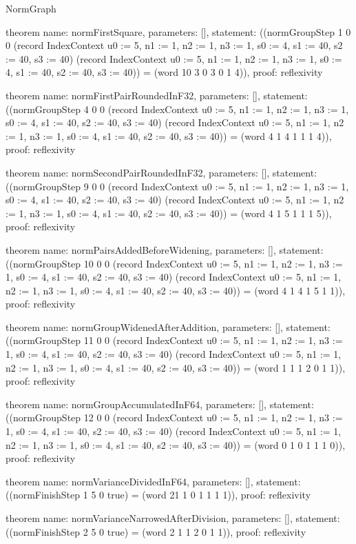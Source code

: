 \begin{lexlean}{NormGraph}
\begin{semanticmodule}
theorem{
  name: normFirstSquare,
  parameters: [],
  statement: ((normGroupStep 1 0 0 (record IndexContext {u0 := 5, n1 := 1, n2 := 1, n3 := 1, s0 := 4, s1 := 40, s2 := 40, s3 := 40}) (record IndexContext {u0 := 5, n1 := 1, n2 := 1, n3 := 1, s0 := 4, s1 := 40, s2 := 40, s3 := 40})) = (word 10 3 0 3 0 1 4)),
  proof: reflexivity{}
}

theorem{
  name: normFirstPairRoundedInF32,
  parameters: [],
  statement: ((normGroupStep 4 0 0 (record IndexContext {u0 := 5, n1 := 1, n2 := 1, n3 := 1, s0 := 4, s1 := 40, s2 := 40, s3 := 40}) (record IndexContext {u0 := 5, n1 := 1, n2 := 1, n3 := 1, s0 := 4, s1 := 40, s2 := 40, s3 := 40})) = (word 4 1 4 1 1 1 4)),
  proof: reflexivity{}
}

theorem{
  name: normSecondPairRoundedInF32,
  parameters: [],
  statement: ((normGroupStep 9 0 0 (record IndexContext {u0 := 5, n1 := 1, n2 := 1, n3 := 1, s0 := 4, s1 := 40, s2 := 40, s3 := 40}) (record IndexContext {u0 := 5, n1 := 1, n2 := 1, n3 := 1, s0 := 4, s1 := 40, s2 := 40, s3 := 40})) = (word 4 1 5 1 1 1 5)),
  proof: reflexivity{}
}

theorem{
  name: normPairsAddedBeforeWidening,
  parameters: [],
  statement: ((normGroupStep 10 0 0 (record IndexContext {u0 := 5, n1 := 1, n2 := 1, n3 := 1, s0 := 4, s1 := 40, s2 := 40, s3 := 40}) (record IndexContext {u0 := 5, n1 := 1, n2 := 1, n3 := 1, s0 := 4, s1 := 40, s2 := 40, s3 := 40})) = (word 4 1 4 1 5 1 1)),
  proof: reflexivity{}
}

theorem{
  name: normGroupWidenedAfterAddition,
  parameters: [],
  statement: ((normGroupStep 11 0 0 (record IndexContext {u0 := 5, n1 := 1, n2 := 1, n3 := 1, s0 := 4, s1 := 40, s2 := 40, s3 := 40}) (record IndexContext {u0 := 5, n1 := 1, n2 := 1, n3 := 1, s0 := 4, s1 := 40, s2 := 40, s3 := 40})) = (word 1 1 1 2 0 1 1)),
  proof: reflexivity{}
}

theorem{
  name: normGroupAccumulatedInF64,
  parameters: [],
  statement: ((normGroupStep 12 0 0 (record IndexContext {u0 := 5, n1 := 1, n2 := 1, n3 := 1, s0 := 4, s1 := 40, s2 := 40, s3 := 40}) (record IndexContext {u0 := 5, n1 := 1, n2 := 1, n3 := 1, s0 := 4, s1 := 40, s2 := 40, s3 := 40})) = (word 0 1 0 1 1 1 0)),
  proof: reflexivity{}
}

theorem{
  name: normVarianceDividedInF64,
  parameters: [],
  statement: ((normFinishStep 1 5 0 true) = (word 21 1 0 1 1 1 1)),
  proof: reflexivity{}
}

theorem{
  name: normVarianceNarrowedAfterDivision,
  parameters: [],
  statement: ((normFinishStep 2 5 0 true) = (word 2 1 1 2 0 1 1)),
  proof: reflexivity{}
}


\end{semanticmodule}
\end{lexlean}
